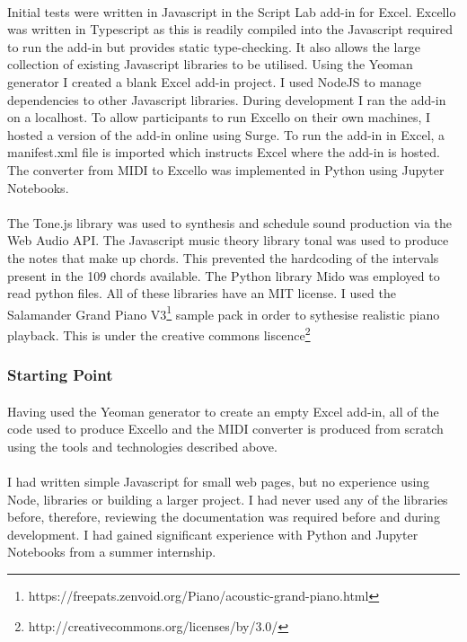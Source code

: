 \paragraph{} Initial tests were written in Javascript in the Script Lab add-in for Excel. Excello was written in Typescript as this is readily compiled into the Javascript required to run the add-in but provides static type-checking. It also allows the large collection of existing Javascript libraries to be utilised. Using the Yeoman generator I created a blank Excel add-in project. I used NodeJS to manage dependencies to other Javascript libraries. During development I ran the add-in on a localhost. To allow participants to run Excello on their own machines, I hosted a version of the add-in online using Surge. To run the add-in in Excel, a manifest.xml file is imported which instructs Excel where the add-in is hosted. The converter from MIDI to Excello was implemented in Python using Jupyter Notebooks.

\paragraph{} The Tone.js library was used to synthesis and schedule sound production via the Web Audio API. The Javascript music theory library tonal was used to produce the notes that make up chords. This prevented the hardcoding of the intervals present in the 109 chords available. The Python library Mido was employed to read python files. All of these libraries have an MIT license. I used the Salamander Grand Piano V3\footnote{https://freepats.zenvoid.org/Piano/acoustic-grand-piano.html} sample pack in order to sythesise realistic piano playback. This is under the creative commons liscence\footnote{http://creativecommons.org/licenses/by/3.0/}

\subsubsection{Starting Point}

\paragraph{} Having used the Yeoman generator to create an empty Excel add-in, all of the code used to produce Excello and the MIDI converter is produced from scratch using the tools and technologies described above.

\paragraph{} I had written simple Javascript for small web pages, but no experience using Node, libraries or building a larger project. I had never used any of the libraries before, therefore, reviewing the documentation was required before and during development. I had gained significant experience with Python and Jupyter Notebooks from a summer internship.

